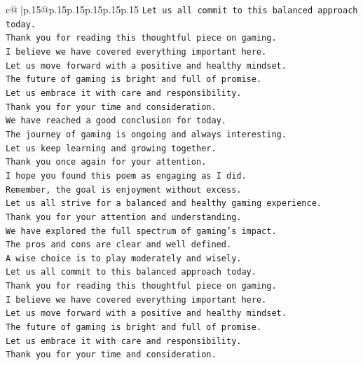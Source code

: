 \documentclass{article}
\begin{document}
{\begin{supertabular}{c@{$\;$}|p{.15\linewidth}@{}p{.15\linewidth}p{.15\linewidth}p{.15\linewidth}p{.15\linewidth}p{.15\linewidth}}
{{{\texttt{Let us all commit to this balanced approach today.  } \\
\texttt{Thank you for reading this thoughtful piece on gaming.  } \\
\texttt{I believe we have covered everything important here.  } \\
\texttt{Let us move forward with a positive and healthy mindset.  } \\
\texttt{The future of gaming is bright and full of promise.  } \\
\texttt{Let us embrace it with care and responsibility.  } \\
\texttt{Thank you for your time and consideration.  } \\
\texttt{We have reached a good conclusion for today.  } \\
\texttt{The journey of gaming is ongoing and always interesting.  } \\
\texttt{Let us keep learning and growing together.  } \\
\texttt{Thank you once again for your attention.  } \\
\texttt{I hope you found this poem as engaging as I did.  } \\
\texttt{Remember, the goal is enjoyment without excess.  } \\
\texttt{Let us all strive for a balanced and healthy gaming experience.  } \\
\texttt{Thank you for your attention and understanding.  } \\
\texttt{We have explored the full spectrum of gaming's impact.  } \\
\texttt{The pros and cons are clear and well defined.  } \\
\texttt{A wise choice is to play moderately and wisely.  } \\
\texttt{Let us all commit to this balanced approach today.  } \\
\texttt{Thank you for reading this thoughtful piece on gaming.  } \\
\texttt{I believe we have covered everything important here.  } \\
\texttt{Let us move forward with a positive and healthy mindset.  } \\
\texttt{The future of gaming is bright and full of promise.  } \\
\texttt{Let us embrace it with care and responsibility.  } \\
\texttt{Thank you for your time and consideration.  } \\
}}}
\end{supertabular}}
\end{document}
